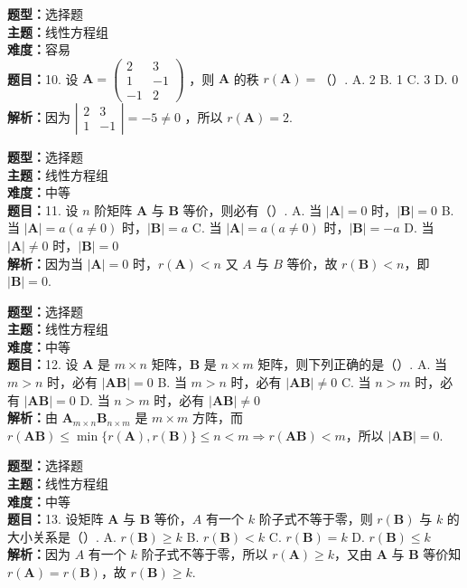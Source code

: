 \documentclass{ctexart}
\newenvironment{question}[5]{%
	\noindent\textbf{题型：}#1\\
	\textbf{主题：}#2\\
	\textbf{难度：}#3\\
	\textbf{题目：}#4\\
	\textbf{解析：}#5\\
	\vspace{1em}
}{}
\begin{document}
	\begin{question}
		{选择题}
		{线性方程组}
		{容易}
		{10. 设 \(\mathbf{A}=\left(\begin{array}{cc}2 & 3 \\ 1 & -1 \\ -1 & 2\end{array}\right)\) ，则 \(\mathbf{A}\) 的秩 \(r(\mathbf{A})=\)（）. 
			A. 2
			B. 1
			C. 3
			D. 0}
		{因为 \(\left|\begin{array}{cc}2 & 3 \\ 1 & -1\end{array}\right|=-5 \neq 0\) ，所以 \(r(\mathbf{A})=2\). }
	\end{question}
	
	\begin{question}
		{选择题}
		{线性方程组}
		{中等}
		{11. 设 \(n\) 阶矩阵 \(\mathbf{A}\) 与 \(\mathbf{B}\) 等价，则必有（）. 
			A. 当 \(|\mathbf{A}|=0\) 时，\(|\mathbf{B}|=0\)
			B. 当 \(|\mathbf{A}|=a(a \neq 0)\) 时，\(|\mathbf{B}|=a\)
			C. 当 \(|\mathbf{A}|=a(a \neq 0)\) 时，\(|\mathbf{B}|=-a\)
			D. 当 \(|\mathbf{A}| \neq 0\) 时，\(|\mathbf{B}|=0\)}
		{因为当 \(|\mathbf{A}|=0\) 时，\(r(\mathbf{A})<n\) 又 \(A\) 与 \(B\) 等价，故 \(r(\mathbf{B})<n\)，即 \(|\mathbf{B}|=0\). }
	\end{question}
	
	\begin{question}
		{选择题}
		{线性方程组}
		{中等}
		{12. 设 \(\mathbf{A}\) 是 \(m \times n\) 矩阵，\(\mathbf{B}\) 是 \(n \times m\) 矩阵，则下列正确的是（）. 
			A. 当 \(m>n\) 时，必有 \(|\mathbf{A B}|=0\)
			B. 当 \(m>n\) 时，必有 \(|\mathbf{A B}| \neq 0\)
			C. 当 \(n>m\) 时，必有 \(|\mathbf{A B}|=0\)
			D. 当 \(n>m\) 时，必有 \(|\mathbf{A B}| \neq 0\)}
		{由 \(\mathbf{A}_{m \times n} \mathbf{B}_{n \times m}\) 是 \(m \times m\) 方阵，而 \(r(\mathbf{A B}) \leq \min \{r(\mathbf{A}), r(\mathbf{B})\} \leq n<m \Rightarrow r(\mathbf{A B})<m\)，所以 \(|\mathbf{A B}|=0\). }
	\end{question}
	
	\begin{question}
		{选择题}
		{线性方程组}
		{中等}
		{13. 设矩阵 \(\mathbf{A}\) 与 \(\mathbf{B}\) 等价，\(A\) 有一个 \(k\) 阶子式不等于零，则 \(r(\mathbf{B})\) 与 \(k\) 的大小关系是（）. 
			A. \(r(\mathbf{B}) \geq k\)
			B. \(r(\mathbf{B})<k\)
			C. \(r(\mathbf{B})=k\)
			D. \(r(\mathbf{B}) \leq k\)}
		{因为 \(A\) 有一个 \(k\) 阶子式不等于零，所以 \(r(\mathbf{A}) \geq k\)，又由 \(\mathbf{A}\) 与 \(\mathbf{B}\) 等价知 \(r(\mathbf{A})=r(\mathbf{B})\)，故 \(r(\mathbf{B}) \geq k\). }
	\end{question}
	
\end{document}
